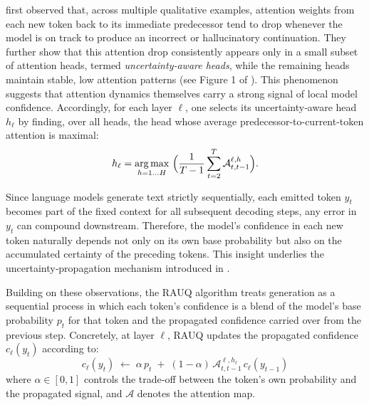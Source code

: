 \documentclass[letterpaper]{article} %
\begin{document}
\citet{vazhentsev2025uncertaintyawareattentionheadsefficient} first observed that, across multiple qualitative examples, attention weights from each new token back to its immediate predecessor tend to drop whenever the model is on track to produce an incorrect or hallucinatory continuation. They further show that this attention drop consistently appears only in a small subset of attention heads, termed \emph{uncertainty-aware heads}, while the remaining heads maintain stable, low attention patterns (see Figure 1 of \cite{vazhentsev2025uncertaintyawareattentionheadsefficient}). This phenomenon suggests that attention dynamics themselves carry a strong signal of local model confidence. Accordingly, for each layer \(\ell\), one selects its uncertainty‑aware head \(h_\ell\) by finding, over all heads, the head whose average predecessor-to-current-token attention is maximal:
{\footnotesize
\begin{equation}
\label{rauq_agg}
    h_\ell = \underset{h=1\dots H}{\arg\max}\ 
      \Bigl(\frac{1}{T-1}\sum_{t=2}^{T} \mathcal{A}^{\ell, h}_{t, t-1}\Bigr).
\end{equation}}

Since language models generate text strictly sequentially, each emitted token \(y_t\) becomes part of the fixed context for all subsequent decoding steps, any error in \(y_t\) can compound downstream. Therefore, the model’s confidence in each new token naturally depends not only on its own base probability but also on the accumulated certainty of the preceding tokens. This insight underlies the uncertainty‑propagation mechanism introduced in \cite{zhang2023enhancinguncertaintybasedhallucinationdetection}.

Building on these observations, the RAUQ algorithm treats generation as a sequential process in which each token’s confidence is a blend of the model’s base probability \(p_t\) for that token and the propagated confidence carried over from the previous step. Concretely, at layer \(\ell\), RAUQ updates the propagated confidence \(c_\ell(y_t)\) according to:
{\footnotesize
\begin{equation}
\label{rauq_conf}
    c_\ell(y_t)\;\gets\;
          \alpha\,p_t
          \;+\;(1-\alpha)\,\mathcal{A}^{\ell, h_\ell}_{t, t-1}\,c_\ell(y_{t-1})
\end{equation}}
where \(\alpha\in[0,1]\) controls the trade‑off between the token’s own probability and the propagated signal, and \(\mathcal{A}\) denotes the attention map.
\end{document}
